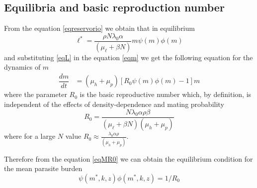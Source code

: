 \documentclass[eng]{MMSB-class-eng}
\begin{document}
\subsection{Equilibria and basic reproduction number}
From the equation \eqref{eqreservorio} we obtain that in equilibrium
\begin{equation}\label{eqL}
\ell^*=\frac{\rho N \lambda_0 \alpha}{(\mu_{\ell}+\beta N)} m \psi(m)\phi(m) 
\end{equation} 
and substituting \eqref{eqL} in the equation \eqref{eqm} we get the following equation for the dynamics of $m$
\begin{align}\label{eqMR0}
\dfrac{dm}{dt}&=(\mu_h + \mu_p)\left[ R_0  \psi(m)\phi(m) -1 \right] m%
\end{align}
where the parameter $R_0$ is the basic reproductive number which, by definition, is independent of the effects of density-dependence and  mating probability
\begin{equation}\label{valorR0}
R_0=\frac{ N \lambda_0 \alpha  \rho \beta}{ (\mu_{\ell}+\beta N) (\mu_h + \mu_p) }
\end{equation}
where for a large $N$ value $R_0\approx \frac{ \lambda_0 \alpha  \rho }{ (\mu_h + \mu_p) }$.





Therefore from the equation \eqref{eqMR0} we can obtain the equilibrium condition for the mean parasite burden
\begin{equation}\label{eqequilibrio}
\psi(m^*,k,z)\phi(m^*,k,z)=1/R_0
\end{equation}
\end{document}
